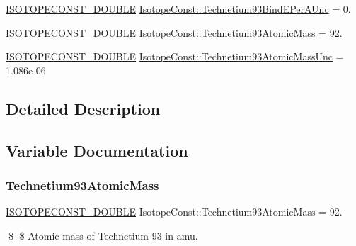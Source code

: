 \begin{DoxyCompactItemize}
\mbox{\hyperlink{group___isotope_const-_macros_ga8f45a7272ce02c0b4c65c44636ed719a}{I\+S\+O\+T\+O\+P\+E\+C\+O\+N\+S\+T\+\_\+\+D\+O\+U\+B\+LE}} \mbox{\hyperlink{group___isotope_const-_technetium-_tc93_gaa7068de76ed964926f5fff6cef633d12}{Isotope\+Const\+::\+Technetium93\+Bind\+E\+Per\+A\+Unc}} = 0.
\item 
\mbox{\hyperlink{group___isotope_const-_macros_ga8f45a7272ce02c0b4c65c44636ed719a}{I\+S\+O\+T\+O\+P\+E\+C\+O\+N\+S\+T\+\_\+\+D\+O\+U\+B\+LE}} \mbox{\hyperlink{group___isotope_const-_technetium-_tc93_ga212183302393dca36007874c67132302}{Isotope\+Const\+::\+Technetium93\+Atomic\+Mass}} = 92.
\item 
\mbox{\hyperlink{group___isotope_const-_macros_ga8f45a7272ce02c0b4c65c44636ed719a}{I\+S\+O\+T\+O\+P\+E\+C\+O\+N\+S\+T\+\_\+\+D\+O\+U\+B\+LE}} \mbox{\hyperlink{group___isotope_const-_technetium-_tc93_gad0050411d63e43c1ecb62c5859e45f07}{Isotope\+Const\+::\+Technetium93\+Atomic\+Mass\+Unc}} = 1.\+086e-\/06
\end{DoxyCompactItemize}


\subsection{Detailed Description}


\subsection{Variable Documentation}
\mbox{\label{group___isotope_const-_technetium-_tc93_ga212183302393dca36007874c67132302}} 
\subsubsection{\texorpdfstring{Technetium93\+Atomic\+Mass}{Technetium93AtomicMass}}
{\footnotesize\ttfamily \mbox{\hyperlink{group___isotope_const-_macros_ga8f45a7272ce02c0b4c65c44636ed719a}{I\+S\+O\+T\+O\+P\+E\+C\+O\+N\+S\+T\+\_\+\+D\+O\+U\+B\+LE}} Isotope\+Const\+::\+Technetium93\+Atomic\+Mass = 92.}

\$ \$ Atomic mass of Technetium-\/93 in amu. \mbox{\label{group___isotope_const-_technetium-_tc93_gad0050411d63e43c1ecb62c5859e45f07}} 
